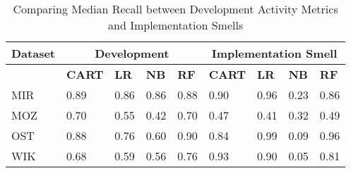 \documentclass[smallextended]{svjour3}       %
\begin{document}
\begin{table*}[]
\centering
\caption{Comparing Median Recall between Development Activity Metrics and Implementation Smells} 
\label{res:rq1:table:rec:smell}
\footnotesize{  
\begin{tabular}{p{1.2cm} p{0.9cm} p{0.9cm} p{0.9cm} p{0.9cm} p{0.9cm} p{0.6cm} p{0.6cm} p{0.6cm}  }
\hline
\textbf{Dataset} & \multicolumn{4}{c}{\textbf{Development}} & \multicolumn{4}{c}{\textbf{Implementation Smell}} \\
\hline
 &  \textbf{CART} & \textbf{LR} & \textbf{NB} & \textbf{RF} & \textbf{CART} & \textbf{LR} & \textbf{NB} & \textbf{RF} \\
\hline
MIR & 0.89                       & 0.86 & 0.86 & 0.88                        & 0.90 &  \cellcolor{lightgray} 0.96 & 0.23 & 0.86   \\
MOZ & \cellcolor{lightgray} 0.70 & 0.55 & 0.42 & \cellcolor{lightgray} 0.70  & 0.47 & 0.41 & 0.32 & 0.49    \\
OST & 0.88                       & 0.76 & 0.60 & 0.90                        & 0.84 & \cellcolor{lightgray} 0.99 & 0.09 & 0.96    \\
WIK & 0.68                       & 0.59 & 0.56 & 0.76                        & \cellcolor{lightgray} 0.93 &  0.90 & 0.05 & 0.81   \\
\hline
\end{tabular}
}
\end{table*}  




\end{document}
